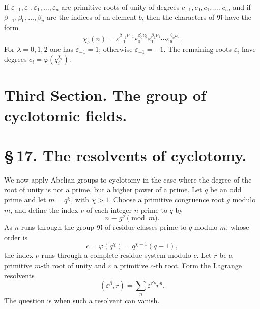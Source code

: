 \documentclass[11pt]{article}
\providecommand{\grpN}{\mathfrak N}
\begin{document}
If $\varepsilon_{-1},\varepsilon_0,
\varepsilon_1,
\ldots,
\varepsilon_u$ are primitive roots of unity of degrees $c_{-1},c_0,c_1,
\ldots,c_u$, and if $\beta_{-1},\beta_0,
\ldots,
\beta_u$ are the indices of an element $b$, then the characters of $\grpN$ have the form
\begin{equation}
 \chi_b(n)=\varepsilon_{-1}^{\beta_{-1}\nu_{-1}}
 \varepsilon_0^{\beta_0\nu_0}
 \varepsilon_1^{\beta_1\nu_1}\cdots
 \varepsilon_u^{\beta_u\nu_u}.
\tag{7}
\end{equation}
For $\lambda=0,1,2$ one has $\varepsilon_{-1}=1$; otherwise $\varepsilon_{-1}=-1$. The remaining roots $\varepsilon_i$ have degrees $c_i=\varphi(q_i^{\chi_i})$.

\section*{Third Section. The group of cyclotomic fields.}

\section*{\S\,17. The resolvents of cyclotomy.}

We now apply Abelian groups to cyclotomy in the case where the degree of the root of unity is not a prime, but a higher power of a prime. Let $q$ be an odd prime and let $m=q^\chi$, with $\chi>1$. Choose a primitive congruence root $g$ modulo $m$, and define the index $\nu$ of each integer $n$ prime to $q$ by
\begin{equation}
 n\equiv g^\nu\pmod m.
\tag{1}
\end{equation}
As $n$ runs through the group $\grpN$ of residue classes prime to $q$ modulo $m$, whose order is
\begin{equation}
 c=\varphi(q^\chi)=q^{\chi-1}(q-1),
\tag{2}
\end{equation}
the index $\nu$ runs through a complete residue system modulo $c$. Let $r$ be a primitive $m$-th root of unity and $\varepsilon$ a primitive $c$-th root. Form the Lagrange resolvents
\begin{equation}
 (\varepsilon^\beta,r)=\sum_n \varepsilon^{\beta\nu}r^n.
\tag{3}
\end{equation}
The question is when such a resolvent can vanish.
\end{document}
